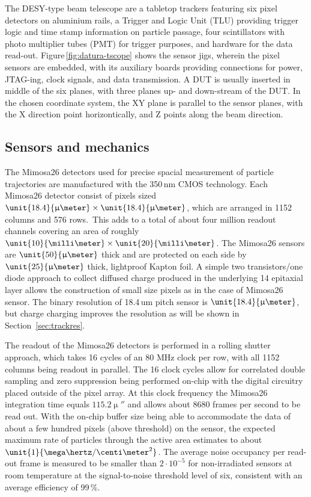 
The DESY-type beam telescope are a tabletop trackers featuring six pixel detectors on aluminium rails, a Trigger and Logic Unit (TLU) providing trigger logic and time stamp information on particle passage,
 four scintillators with photo multiplier tubes (PMT) for trigger purposes, and hardware for the data read-out. 
Figure\,\ref{fig:datura-tscope} shows the sensor jigs, wherein the pixel sensors are embedded, with its auxiliary boards providing connections for power, JTAG-ing, clock signals, and data transmission.
A DUT is usually inserted in middle of the six planes, with three planes up- and down-stream of the DUT. 
In the chosen coordinate system, the XY plane is parallel to the sensor planes, with the X direction point horizontically, and Z points along the beam direction. 
 
\subsection{Sensors and mechanics}

The Mimosa26 detectors used for precise spacial measurement of particle trajectories are manufactured with the 350\,nm CMOS technology. 
Each Mimosa26 detector consist of pixels sized $\unit{18.4}{\upmu\meter} \times \unit{18.4}{\upmu\meter}$, which are arranged in 1152 columns and 576 rows.\,\cite{Mimosa26}
This adds to a total of about four million readout channels covering an area of roughly $\unit{10}{\milli\meter} \times \unit{20}{\milli\meter}$. 
The Mimosa26 sensors are $\unit{50}{\upmu\meter}$ thick and are protected on each side by $\unit{25}{\upmu\meter}$ thick, lightproof Kapton foil. 
A simple two transistors/one diode approach to collect diffused charge produced in the underlying \unit{14}{\upmu\meter} epitaxial layer
 allows the construction of small size pixels as in the case of Mimosa26 sensor.
The binary resolution of 18.4\,um pitch sensor is $\unit{18.4}{\upmu\meter}$, but charge charging improves the resolution as will be shown in Section~\ref{sec:trackres}.

The readout of the Mimosa26 detectors is performed in a rolling shutter approach, which takes 16 cycles of an 80 MHz clock per row, with all 1152 columns being readout in parallel. 
The 16 clock cycles allow for correlated double sampling and zero suppression being performed on-chip with the digital circuitry placed outside of the pixel array.
At this clock frequency the Mimosa26 integration time equals $\unit{115.2}{\upmu\second}$ and allows about 8680 frames per second to be read out. 
With the on-chip buffer size being able to accommodate the data of about a few hundred pixels (above threshold) on the sensor,
the expected maximum rate of particles through the active area estimates to about $\unit{1}{\mega\hertz/\centi\meter^2}$. 
The average noise occupancy per read-out frame is measured to be smaller than $2\cdot10^{-5}$ for non-irradiated sensors at room temperature at the signal-to-noise threshold level of six,
 consistent with an average efficiency of 99\,\%. 


